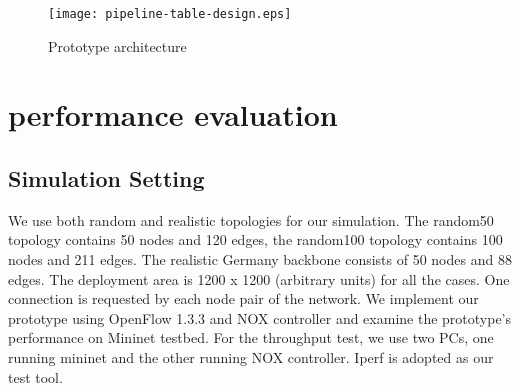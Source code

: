\documentclass[10pt,journal]{IEEEtran}
\begin{document}
\begin{figure}[!h]
 \begin{center}
		\texttt{[image: pipeline-table-design.eps]}
	\caption{Prototype architecture}
	\label{fig:proposed_architecture}
 \end{center}
\end{figure}


\section{performance evaluation}\label{sec:performance_evaluation}
\subsection{Simulation Setting}
 We use both random and realistic topologies for our simulation. The random50 topology contains 50 nodes and 120 edges, the random100 topology contains 100 nodes and 211 edges. The realistic Germany backbone consists of 50 nodes and 88 edges. The deployment area is 1200 x 1200 (arbitrary units) for all the cases. One connection is requested by each node pair of the network. We implement our prototype using OpenFlow 1.3.3\cite{specification2013version} and NOX controller\cite{gude2008nox} and examine the prototype's performance on Mininet testbed\cite{lantz2010network}. For the throughput test, we use two PCs, one running mininet and the other running NOX controller. Iperf \cite{tirumala2005iperf} is adopted as our test tool.
\end{document}
